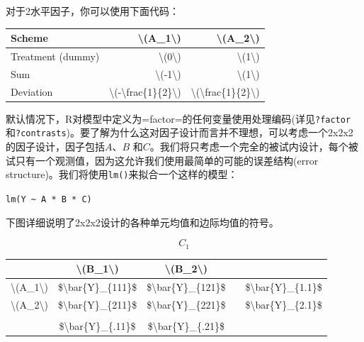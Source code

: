 \documentclass[
]{book}
\begin{document}
对于2水平因子，你可以使用下面代码：

\begin{table}
\centering
\begin{tabular}{l|r|r}
\hline
Scheme & \textbackslash{}(A\_1\textbackslash{}) & \textbackslash{}(A\_2\textbackslash{})\\
\hline
Treatment (dummy) & \textbackslash{}(0\textbackslash{}) & \textbackslash{}(1\textbackslash{})\\
\hline
Sum & \textbackslash{}(-1\textbackslash{}) & \textbackslash{}(1\textbackslash{})\\
\hline
Deviation & \textbackslash{}(-\textbackslash{}frac\{1\}\{2\}\textbackslash{}) & \textbackslash{}(\textbackslash{}frac\{1\}\{2\}\textbackslash{})\\
\hline
\end{tabular}
\end{table}

默认情况下，R对模型中定义为=factor=的任何变量使用处理编码(详见\texttt{?factor}和\texttt{?contrasts})。要了解为什么这对因子设计而言并不理想，可以考虑一个2x2x2的因子设计，因子包括\(A\)、\(B\) 和\(C\)。我们将只考虑一个完全的被试内设计，每个被试只有一个观测值，因为这允许我们使用最简单的可能的误差结构(error structure)。我们将使用\texttt{lm()}来拟合一个这样的模型：

\texttt{lm(Y\ \textasciitilde{}\ A\ *\ B\ *\ C)}

下图详细说明了2x2x2设计的各种单元均值和边际均值的符号。

\[C_1\]

\begin{table}
\centering
\begin{tabular}{c|c|c|c|c}
\hline
 & \textbackslash{}(B\_1\textbackslash{}) & \textbackslash{}(B\_2\textbackslash{}) &  & \\
\hline
\textbackslash{}(A\_1\textbackslash{}) & \$\textbackslash{}bar\{Y\}\_\{111\}\$ & \$\textbackslash{}bar\{Y\}\_\{121\}\$ &  & \$\textbackslash{}bar\{Y\}\_\{1.1\}\$\\
\hline
\textbackslash{}(A\_2\textbackslash{}) & \$\textbackslash{}bar\{Y\}\_\{211\}\$ & \$\textbackslash{}bar\{Y\}\_\{221\}\$ &  & \$\textbackslash{}bar\{Y\}\_\{2.1\}\$\\
\hline
 &  &  &  & \\
\hline
 & \$\textbackslash{}bar\{Y\}\_\{.11\}\$ & \$\textbackslash{}bar\{Y\}\_\{.21\}\$ &  & \\
\hline
\end{tabular}
\end{table}
\end{document}
